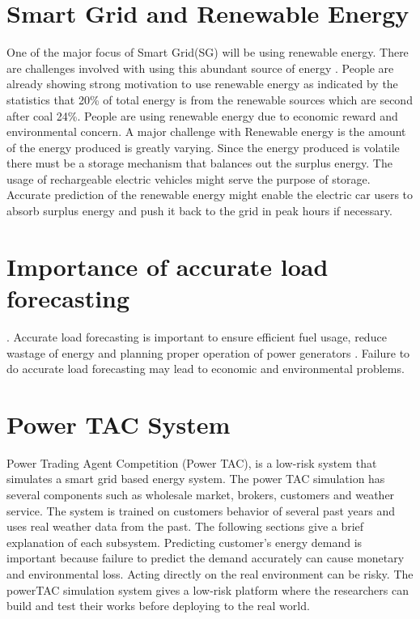 \section{Smart Grid and Renewable Energy}
One of the major focus of Smart Grid(SG) will be using renewable energy. There are challenges involved with using this abundant source of energy \cite{richter2012transitioning}. People are already showing strong motivation to use renewable energy as indicated by the statistics that 20\% of total energy is from the renewable sources which are second after coal 24\%. People are using renewable energy due to economic reward and environmental concern. A major challenge with Renewable energy is the amount of the energy produced is greatly varying. Since the energy produced is volatile there must be a storage mechanism that balances out the surplus energy. The usage of rechargeable electric vehicles might serve the purpose of storage. Accurate prediction of the renewable energy might enable the electric car users to absorb surplus energy and push it back to the grid in peak hours if necessary. 




\section{Importance of accurate load forecasting}.
Accurate load forecasting is important to ensure efficient fuel usage, reduce wastage of energy and planning proper operation of power generators \cite{liu2006accurate}. Failure to do accurate load forecasting may lead to economic and environmental problems.


\section{Power TAC System}

Power Trading Agent Competition (Power TAC), is a low-risk system that simulates a smart grid based energy system. The power TAC simulation has several components such as wholesale market, brokers, customers and weather service. The system is trained on customers behavior of several past years and uses real weather data from the past. The following sections give a brief explanation of each subsystem. 
Predicting customer's energy demand is important because failure to predict the demand accurately can cause monetary and environmental loss. Acting directly on the real environment can be risky. The powerTAC simulation system gives a low-risk platform where the researchers can build and test their works before deploying to the real world. 

